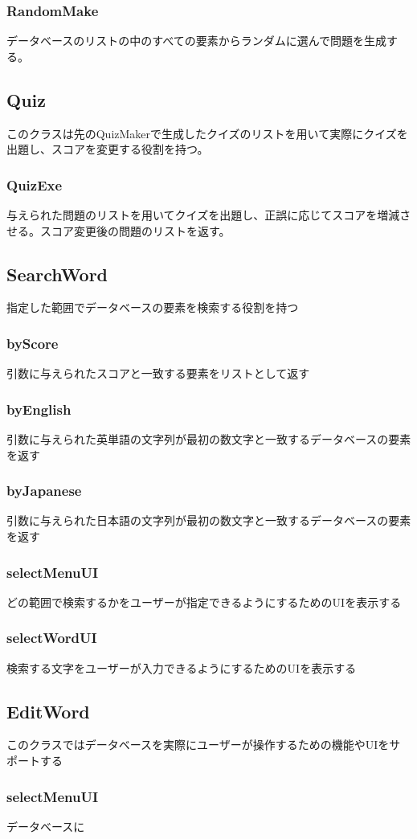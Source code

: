 \documentclass{ltjsarticle}
\begin{document}
\subsubsection{RandomMake}
データベースのリストの中のすべての要素からランダムに選んで問題を生成する。

\subsection{Quiz}
このクラスは先のQuizMakerで生成したクイズのリストを用いて実際にクイズを出題し、スコアを変更する役割を持つ。
\subsubsection{QuizExe}
与えられた問題のリストを用いてクイズを出題し、正誤に応じてスコアを増減させる。スコア変更後の問題のリストを返す。

\subsection{SearchWord}
指定した範囲でデータベースの要素を検索する役割を持つ
\subsubsection{byScore}
引数に与えられたスコアと一致する要素をリストとして返す
\subsubsection{byEnglish}
引数に与えられた英単語の文字列が最初の数文字と一致するデータベースの要素を返す
\subsubsection{byJapanese}
引数に与えられた日本語の文字列が最初の数文字と一致するデータベースの要素を返す
\subsubsection{selectMenuUI}
どの範囲で検索するかをユーザーが指定できるようにするためのUIを表示する
\subsubsection{selectWordUI}
検索する文字をユーザーが入力できるようにするためのUIを表示する

\subsection{EditWord}
このクラスではデータベースを実際にユーザーが操作するための機能やUIをサポートする
\subsubsection{selectMenuUI}
データベースに
\end{document}
